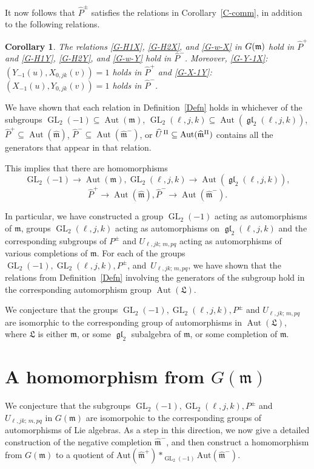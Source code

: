 \documentclass[11pt,letterpaper]{amsart}
\newcounter{thecounter}
\numberwithin{thecounter}{section}
\newtheorem{corollary}[thecounter]{Corollary}
\theoremstyle{definition}
\DeclareMathOperator{\GL}{GL}
\DeclareMathOperator{\gl}{\mathfrak{gl}}
\DeclareMathOperator{\Aut}{Aut}
\newcommand{\C}{{\mathbb C}}
\newcommand{\Ppm}{{{P}^\pm}}
\newcommand{\UhPi}{{\widehat{U}^{\,\Pi}}}
\newcommand{\Php}{{\widehat{P}^+}}
\newcommand{\Phm}{{\widehat{P}^-}}
\newcommand{\Phpm}{{\widehat{P}^\pm}}
\newcommand{\m}{{\mathfrak{m}}}
\newcommand{\mhat}{{\widehat{\mathfrak{m}}}}
\begin{document}
It now follows that $\Phpm$ satisfies the relations in Corollary~\ref{C-comm}, in addition to the following relations.
\begin{corollary}\label{Prelns} The relations
\eqref{G-H1X}, \eqref{G-H2X}, and \eqref{G-w-X} in $G(\frak m)$ hold in $\Php$ and 
\eqref{G-H1Y}, \eqref{G-H2Y}, and \eqref{G-w-Y} hold in $\Phm$. Moreover,  \eqref{G-Y-1X}:  $(Y_{-1}(u), X_{0,jk}(v)) = 1$ holds in $\widehat{P}^+$ and   \eqref{G-X-1Y}: $(X_{-1}(u), Y_{0,jk}(v)) = 1$ holds in $\widehat{P}^-$.
\end{corollary}



We have  shown that each relation in Definition~\ref{Defn} holds in whichever of the subgroups
$\GL_2(-1)\subseteq\Aut(\mathfrak{m})$, $\GL_2(\ell,j,k)\subseteq\Aut(\gl_2(\ell,j,k))$, $\widehat{{P}}^+\subseteq\Aut(\mhat)$, $\widehat{{P}}^-\subseteq\Aut(\mhat^-)$,  or
$\UhPi\subseteq\Aut(\widehat{\frak m}^\Pi)$ contains all the 
generators that appear in that relation. 

This implies that there are homomorphisms $$\GL_2(-1)\to\Aut(\mathfrak{m}),
\GL_2(\ell,j,k)\to\Aut(\gl_2(\ell,j,k)),$$
$$\widehat{{P}}^+\to\Aut(\mhat),\widehat{{P}}^-\to \Aut(\mhat^-).$$
 
In particular, we have constructed a group $\GL_2(-1)$ acting as automorphisms of $\mathfrak{m}$,
groups $\GL_2(\ell,j,k)$ acting as automorphisms on $\gl_2(\ell,j,k)$ %
  and the corresponding subgroups of $\Ppm$ and $U_{\ell,jk;\,m,pq}$ acting as automorphisms of various completions of $\mathfrak{m}$.
For each of the groups $\GL_2(-1), \GL_2(\ell,j,k), \Ppm$, and~$ U_{\ell,jk;\,m,pq}$,  we have shown %
that  the relations from Definition~\ref{Defn} involving the generators of the subgroup hold in the corresponding automorphism group $\Aut(\mathfrak{L})$.


We conjecture that the groups $\GL_2(-1), \GL_2(\ell,j,k), \Ppm$ and $ U_{\ell,jk;\,m,pq}$  are  isomorphic to the corresponding group of automorphisms in $\Aut(\mathfrak{L})$,  where
 $\mathfrak{L}$ is either $\mathfrak{m}$, or some $\gl_2$ subalgebra of $\mathfrak{m}$, or some completion of $\mathfrak{m}$.


\section{A homomorphism from $G(\mathfrak{m})$}\label{rep}
We conjecture that the subgroups $\GL_2(-1), \GL_2(\ell,j,k), \Ppm$ and $ U_{\ell,jk;\,m,pq}$  in $G(\m)$ are isomorpohic to the corresponding groups of
automorphisms of Lie algebras.
As a step in this direction,  we now give a detailed construction of  the negative completion $\widehat{\mathfrak{m}}^-$, and then construct a homomorphism from  $G(\mathfrak{m})$ to a quotient of $\text{Aut}(\widehat{\mathfrak{m}}^+) *_{\GL_2(-1)} \text{Aut}(\widehat{\mathfrak{m}}^-).$
\end{document}
